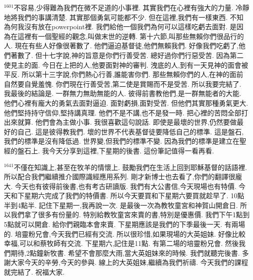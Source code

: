 \documentclass{book}
\begin{document}
$^{1601}$不容易,少得難為我們在微不足道的小事裡.
其實我們在心裡有強大的力量.
冷靜地將我們的事講清楚.
其實那個勇氣可能都不少.
但在這裡,我們有一樣東西.
不知為何我沒有放在powerpoint裡.
我們給他一個我們為何可以這樣吃虧去面對.
是因為在這裡有一個聖經的觀念,叫做末世的逆轉.
第十六節,叫那些無賴你們很品行的人.
現在有些人好像很著數了.
他們逼迫基督徒,他們無賴我們.
好像我們吃虧了,他們著數了.
但十七字說,神的旨意是你們行善受苦.
總好過你們行惡受苦.
因為第二使見主的面.
今日在上把的人,他要面對神的審判.
洩底的人,到有一天見神的面會被平反.
所以第十三字說,你們熱心行善,誰能害你們.
那些無賴你們的人,在神的面前自然要自覺羞愧.
你們現在行善受苦,第二使是賞賜而不是受苦.
所以我要完結了.
我最後的結論是.
一群無力無助無能的人.
彼得前書教他們,是一群無能者的大能.
他們心裡有龐大的勇氣去面對逼迫.
面對虧損,面對受苦.
但他們其實那種勇氣更大.
他們堅持持守信仰,堅持講真理.
他們不是不講,也不是發一時.
把心裡的苦悶全部打出來就算.
他們會為主做小事.
我很喜歡這句說話.
即使是最壞的世界,仍然要做最好的自己.
這是彼得教我們.
壞的世界不代表基督徒要降低自己的標準.
這是盤石,我們的標準是沒有降低過.
世界變,但我們的標準不變.
因為我們的標準是建立在聖經的盤石上.
我今天分享到這裡,下星期的後書.
這份筆記值得一看再看.

$^{1641}$不僅在知識上,甚至在牧羊的情懷上.
鼓勵我們在生活上回到耶穌基督的話語裡.
所以配合我們繼續推介國際識經應用系列.
剛才新博士也去看了,你們的翻譯很龐大.
今天也有彼得前後書,也有考古研讀版.
我們有大公書信,今天現場也有特價.
今天和下星期六完成了我們的特價書.
所以今天要買和下星期六要買就趁早了.
10點半到4點半.
記住下星期一,我再說一次.
是最後一次為教牧童宮和神賀山開倉日.
所以我們拿了很多有份量的.
特別給教牧童宮來賣的書,特別是優惠價.
我們下午1點到5點就可以開倉.
給你們親臨本會來賣.
下星期應該是我們的下季最後一天.
有兩場的.
培靈粉兄會,今天我們已經有交流.
所以很珍惜,如果現場的大英姐妹.
好像比較幸福,可以和蔡牧師有交流.
下星期六,記住是11點.
有第二場的培靈粉兄會.
然後我們期待,2點鐘新牧書.
希望不會那麼大雨,當大英姐妹來的時候.
我們就聽完後書.
多謝大家今天的辛勞,今天的參與.
線上的大英姐妹,繼續為我們祈禱.
今天我們的課程就完結了.
祝福大家.
\newpage
\end{document}
